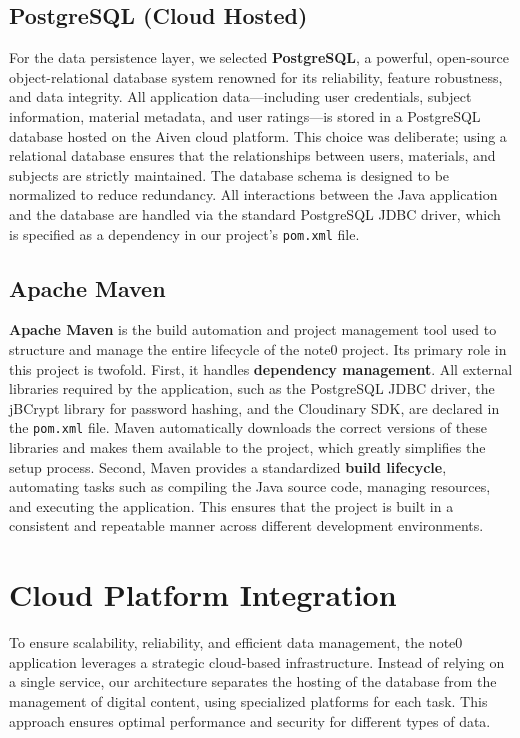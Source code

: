\documentclass[12pt, a4paper]{report}
\begin{document}
\subsection{PostgreSQL (Cloud Hosted)}
For the data persistence layer, we selected \textbf{PostgreSQL}, a powerful, open-source object-relational database system renowned for its reliability, feature robustness, and data integrity. All application data—including user credentials, subject information, material metadata, and user ratings—is stored in a PostgreSQL database hosted on the Aiven cloud platform. This choice was deliberate; using a relational database ensures that the relationships between users, materials, and subjects are strictly maintained. The database schema is designed to be normalized to reduce redundancy. All interactions between the Java application and the database are handled via the standard PostgreSQL JDBC driver, which is specified as a dependency in our project's \texttt{pom.xml} file.

\subsection{Apache Maven}
\textbf{Apache Maven} is the build automation and project management tool used to structure and manage the entire lifecycle of the note0 project. Its primary role in this project is twofold. First, it handles \textbf{dependency management}. All external libraries required by the application, such as the PostgreSQL JDBC driver, the jBCrypt library for password hashing, and the Cloudinary SDK, are declared in the \texttt{pom.xml} file. Maven automatically downloads the correct versions of these libraries and makes them available to the project, which greatly simplifies the setup process. Second, Maven provides a standardized \textbf{build lifecycle}, automating tasks such as compiling the Java source code, managing resources, and executing the application. This ensures that the project is built in a consistent and repeatable manner across different development environments.

\section{Cloud Platform Integration}
To ensure scalability, reliability, and efficient data management, the note0 application leverages a strategic cloud-based infrastructure. Instead of relying on a single service, our architecture separates the hosting of the database from the management of digital content, using specialized platforms for each task. This approach ensures optimal performance and security for different types of data.
\end{document}
